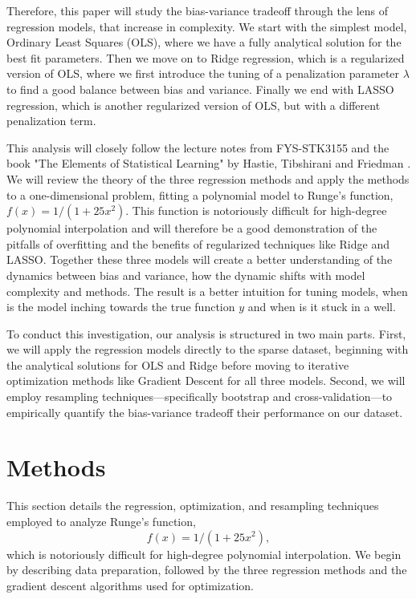 \documentclass[twocolumn,aps]{revtex4}
\begin{document}
Therefore, this paper will study the bias-variance tradeoff through the lens of regression models, that increase in complexity.
We start with the simplest model, Ordinary Least Squares (OLS), where we have a fully analytical solution for the best fit parameters.
Then we move on to Ridge regression, which is a regularized version of OLS, where we first introduce the tuning of a penalization parameter $\lambda$ to find a good balance between bias and variance.
Finally we end with LASSO regression, which is another regularized version of OLS, but with a different penalization term.

This analysis will closely follow the lecture notes from FYS-STK3155 \cite{compfys} and the book "The Elements of Statistical Learning" by Hastie, Tibshirani and Friedman \cite{hastie}.
We will review the theory of the three regression methods and apply the methods to a one-dimensional problem, fitting a polynomial model to Runge's function, $f(x)=1/(1+25x^2)$.
This function is notoriously difficult for high-degree polynomial interpolation and will therefore be a good demonstration of the pitfalls of overfitting and the benefits of regularized techniques like Ridge and LASSO.
Together these three models will create a better understanding of the dynamics between bias and variance, how the dynamic shifts with model complexity and methods.
The result is a better intuition for tuning models, when is the model inching towards the true function $y$ and when is it stuck in a well. 

To conduct this investigation, our analysis is structured in two main parts. 
First, we will apply the regression models directly to the sparse dataset, beginning with the analytical solutions for OLS and Ridge before moving to iterative optimization methods like Gradient Descent for all three models. 
Second, we will employ resampling techniques—specifically bootstrap and cross-validation—to empirically quantify the bias-variance tradeoff their performance on our dataset.


\section{Methods}\label{section:methods}
This section details the regression, optimization, and resampling techniques employed to analyze 
Runge's function, $$f(x)=1/(1+25x^2),$$ which is notoriously difficult for high-degree polynomial interpolation. 
We begin by describing data preparation, followed by the three regression methods and the gradient descent algorithms used for optimization.
\end{document}
